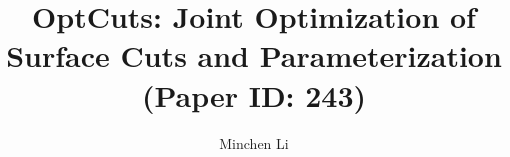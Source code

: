 \documentclass[acmtog, review, anonymous]{acmart}
\begin{document}
\title{OptCuts: Joint Optimization of Surface Cuts and Parameterization
\\ {\small (Paper ID: 243)}
} 

\author{Minchen Li}

\renewcommand\shortauthors{Li, M. et al}

\newcommand{\minchen}[1]{\textcolor{blue}{\textbf{Minchen: #1}}}
\newcommand{\justin}[1]{\textcolor{red}{\textbf{Justin: #1}}}
\newcommand{\alla}[1]{\textcolor{orange}{\textbf{Alla: #1}}}
\newcommand{\danny}[1]{\textcolor{purple}{\textbf{Danny: #1}}}
\newcommand{\vova}[1]{\textcolor{green}{\textbf{Vova: #1}}}
\newcommand{\revised}[1]{\textcolor{red}{\textbf{#1}}}
\newcommand{\old}[1]{\textcolor{green}{\sout{#1}}}
\end{document}

